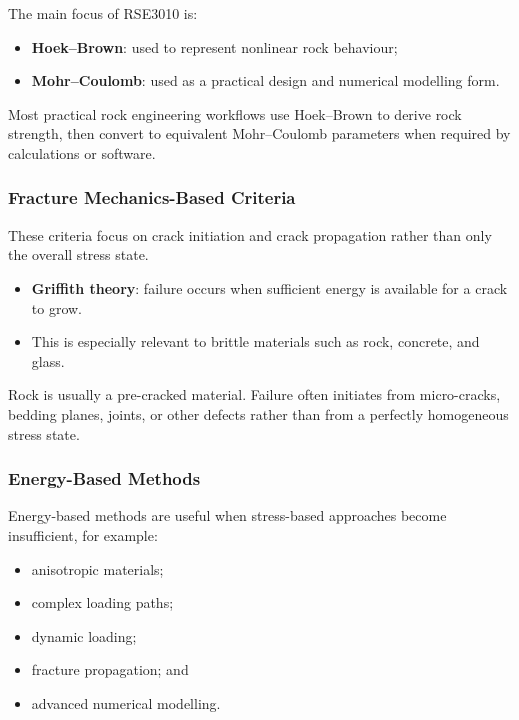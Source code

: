 \documentclass[a4paper,12pt]{article}
\begin{document}
\begin{notebox}
The main focus of RSE3010 is:
\begin{itemize}
    \item \textbf{Hoek--Brown}: used to represent nonlinear rock behaviour;
    \item \textbf{Mohr--Coulomb}: used as a practical design and numerical modelling form.
\end{itemize}
Most practical rock engineering workflows use Hoek--Brown to derive rock strength, then
convert to equivalent Mohr--Coulomb parameters when required by calculations or software.
\end{notebox}

\subsubsection{Fracture Mechanics-Based Criteria}

These criteria focus on crack initiation and crack propagation rather than only the overall
stress state.

\begin{itemize}
    \item \textbf{Griffith theory}: failure occurs when sufficient energy is available for
    a crack to grow.
    \item This is especially relevant to brittle materials such as rock, concrete, and glass.
\end{itemize}

\begin{warnbox}
Rock is usually a pre-cracked material. Failure often initiates from micro-cracks,
bedding planes, joints, or other defects rather than from a perfectly homogeneous stress
state.
\end{warnbox}

\subsubsection{Energy-Based Methods}

Energy-based methods are useful when stress-based approaches become insufficient, for
example:
\begin{itemize}
    \item anisotropic materials;
    \item complex loading paths;
    \item dynamic loading;
    \item fracture propagation; and
    \item advanced numerical modelling.
\end{itemize}
\end{document}

